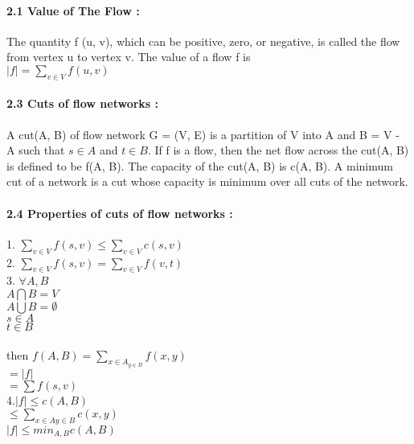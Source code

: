 \documentclass[a4paper,12pt]{article}
\begin{document}
\paragraph*{ 2.1 Value of The Flow :\\} {
The quantity f (u, v), which can be positive, zero, or negative, is called the flow from vertex u to vertex v. The value of a flow f is  \\
$ |f| = \sum_{v \in V}^{} f(u, v) $    \\

}



		\paragraph*{2.3 Cuts of flow networks :  \\}
		{  
			A cut(A, B) of flow network G = (V, E) is a partition of V into A and B = V - A such that $ s \in A $ and $ t \in B $. If f is a flow, then the net flow across the cut(A, B) is defined to be f(A, B). The capacity of the cut(A, B) is c(A, B). A minimum cut of a network is a cut whose capacity is minimum over all cuts of the network.
		}



		\paragraph*{2.4 Properties of cuts of flow networks :   \\}
		{
				1. $ \sum_{ v \in V }^{} f(s, v) \leq \sum_{v \in V}^{}c(s, v) $    \\
				2. $ \sum_{v \in V } f(s, v) = \sum_{v \in V }f(v,t)  $ \\
				3. $ \forall A, B $ \\
			  	$ A \bigcap B = V $  \\
			 	 $ A \bigcup B = \emptyset $  \\
			 	 $ s \in A  $ \\
				  $ t \in B  $     \\ \\
				  then $ f(A, B) = \sum_{x \in A }_{y \in B} f(x, y)$    \\
				 $  = |f| $  \\
				 $  = \sum f(s, v) $     \\
			
				4.$|f| \leq c(A, B)$   \\
					    $ \leq \sum_{x \in A y \in B} c(x, y) $    \\
					    $ |f| \leq min_{A, B}c(A, B)$
					\\
					\\
					\\
					
					 
		}
\end{document}
